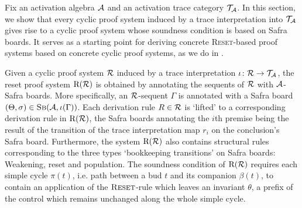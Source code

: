 Fix an activation algebra \( \mathcal{A} \) and an activation trace category \( \mathcal{T}_{\mathcal{A}} \).
In this section, we show that every cyclic proof system induced by a trace
interpretation into $\mathcal{T}_{\mathcal{A}}$ gives rise to a cyclic proof system whose soundness
condition is based on Safra boards. It serves as a starting point
 for deriving
concrete \textsc{Reset}-based proof systems based on concrete cyclic proof
systems, as we do in .

Given a cyclic proof system $\mathcal{R}$ induced by a trace interpretation $\iota \colon \mathcal{R}
\to \mathcal{T}_{\mathcal{A}}$, the reset proof system $\mathrm{R}(\mathcal{R})$ is obtained by annotating the
sequents of $\mathcal{R}$ with $\mathcal{A}$-Safra boards. More specifically, an $\mathcal{R}$-sequent
$\Gamma$ is annotated with a Safra board $(\Theta, \sigma) \in \textsc{Sb}(\mathcal{A},
\iota(\Gamma))$. Each derivation rule $R \in \mathcal{R}$ is `lifted' to a corresponding derivation
rule in $\mathrm{R}(\mathcal{R})$, the Safra boards annotating the $i$th premise being the result
of the transition of the trace interpretation map $r_i$ on the conclusion's
Safra board. Furthermore, the system $\mathrm{R}(\mathcal{R})$ also contains structural rules
corresponding to the three types `bookkeeping transitions' on Safra boards:
Weakening, reset and population. The soundness condition of $\mathrm{R}(\mathcal{R})$ requires
each simple cycle $\pi(t)$, i.e. path between a bud $t$ and its companion $\beta(t)$, to
contain an application of the $\textsc{Reset}$-rule which leaves an invariant
$\theta$, a prefix of the control which remains unchanged along the whole simple
cycle.

